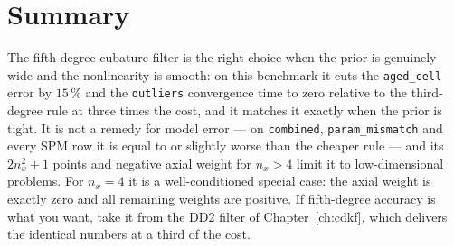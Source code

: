 \section{Summary}
The fifth-degree cubature filter is the right choice when the prior is genuinely wide and the
nonlinearity is smooth: on this benchmark it cuts the \texttt{aged\_cell} error by $15\,\%$ and
the \texttt{outliers} convergence time to zero relative to the third-degree rule at three times
the cost, and it matches it exactly when the prior is tight. It is not a remedy for model error
--- on \texttt{combined}, \texttt{param\_mismatch} and every SPM row it is equal to or slightly
worse than the cheaper rule --- and its $2n_x^2+1$ points and negative axial weight for
$n_x>4$ limit it to low-dimensional problems. For $n_x = 4$ it is a well-conditioned special
case: the axial weight is exactly zero and all remaining weights are positive. If fifth-degree
accuracy is what you want, take it from the DD2 filter of Chapter~\ref{ch:cdkf}, which delivers
the identical numbers at a third of the cost.
